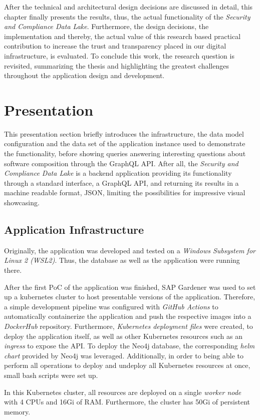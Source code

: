 
After the technical and architectural design decisions are discussed in detail, this chapter finally presents the results, thus, the actual functionality of the \emph{Security and Compliance Data Lake}. Furthermore, the design decisions, the implementation and thereby, the actual value of this research based practical contribution to increase the trust and transparency placed in our digital infrastructure, is evaluated. To conclude this work, the research question is revisited, summarizing the thesis and highlighting the greatest challenges throughout the application design and development. 

\section{Presentation} \label{sec:Presentation}
This presentation section briefly introduces the infrastructure, the data model configuration and the data set of the application instance used to demonstrate the functionality, before showing queries answering interesting questions about software composition through the GraphQL API. After all, the \emph{Security and Compliance Data Lake} is a backend application providing its functionality through a standard interface, a GraphQL API, and returning its results in a machine readable format, JSON, limiting the possibilities for impressive visual showcasing.   

\subsection{Application Infrastructure}
Originally, the application was developed and tested on a \emph{Windows Subsystem for Linux 2 (WSL2)}. Thus, the database as well as the application were running there.\par
After the first PoC of the application was finished, SAP Gardener was used to set up a kubernetes cluster to host presentable versions of the application. Therefore, a simple development pipeline was configured with \emph{GitHub Actions} to automatically containerize the application and push the respective images into a \emph{DockerHub} repository. Furthermore, \emph{Kubernetes deployment files} were created, to deploy the application itself, as well as other Kubernetes resources such as an \emph{ingress} to expose the API. To deploy the Neo4j database, the corresponding \emph{helm chart} provided by Neo4j was leveraged. Additionally, in order to being able to perform all operations to deploy and undeploy all Kubernetes resources at once, small bash scripts were set up.\par
In this Kubernetes cluster, all resources are deployed on a single \emph{worker node} with 4 CPUs and 16Gi of RAM. Furthermore, the cluster has 50Gi of persistent memory.

